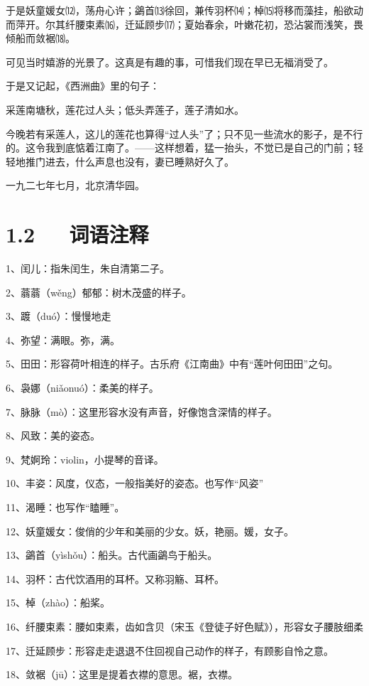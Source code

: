 \documentclass[letterpaper,12pt,english]{sphinxmanual}
\begin{document}
于是妖童媛女⑿，荡舟心许；鷁首⒀徐回，兼传羽杯⒁；棹⒂将移而藻挂，船欲动而萍开。尔其纤腰束素⒃，迁延顾步⒄；夏始春余，叶嫩花初，恐沾裳而浅笑，畏倾船而敛裾⒅。

可见当时嬉游的光景了。这真是有趣的事，可惜我们现在早已无福消受了。

于是又记起，《西洲曲》里的句子：

采莲南塘秋，莲花过人头；低头弄莲子，莲子清如水。

今晚若有采莲人，这儿的莲花也算得“过人头”了；只不见一些流水的影子，是不行的。这令我到底惦着江南了。——这样想着，猛一抬头，不觉已是自己的门前；轻轻地推门进去，什么声息也没有，妻已睡熟好久了。

一九二七年七月，北京清华园。


\section{1.2   词语注释}
\label{\detokenize{p01_u6563_u6587/_u6731_u81ea_u6e05-_u8377_u5858_u6708_u8272:id4}}
1、闰儿：指朱闰生，朱自清第二子。

2、蓊蓊（wěng）郁郁：树木茂盛的样子。

3、踱（duó）：慢慢地走

4、弥望：满眼。弥，满。

5、田田：形容荷叶相连的样子。古乐府《江南曲》中有“莲叶何田田”之句。

6、袅娜（niǎonuó）：柔美的样子。

7、脉脉（mò）：这里形容水没有声音，好像饱含深情的样子。

8、风致：美的姿态。

9、梵婀玲：violin，小提琴的音译。

10、丰姿：风度，仪态，一般指美好的姿态。也写作“风姿”

11、渴睡：也写作“瞌睡”。

12、妖童媛女：俊俏的少年和美丽的少女。妖，艳丽。媛，女子。

13、鷁首（yìshǒu）：船头。古代画鷁鸟于船头。

14、羽杯：古代饮酒用的耳杯。又称羽觞、耳杯。

15、棹（zhào）：船桨。

16、纤腰束素：腰如束素，齿如含贝（宋玉《登徒子好色赋》），形容女子腰肢细柔

17、迁延顾步：形容走走退退不住回视自己动作的样子，有顾影自怜之意。

18、敛裾（jū）：这里是提着衣襟的意思。裾，衣襟。
\end{document}
